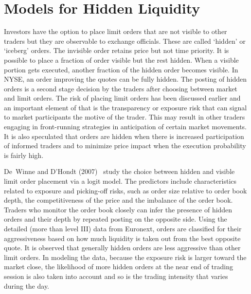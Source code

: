 \section{Models for Hidden Liquidity}

Investors have the option to place limit orders that are not visible to other traders but they are observable to exchange officials. These are called `hidden' or `iceberg' orders. The invisible order retains price but not time priority. It is possible to place a fraction of order visible but the rest hidden. When a visible portion gets executed, another fraction of the hidden order becomes visible. In NYSE, an order improving the quotes can be fully hidden. The posting of hidden orders is a second stage decision by the traders after choosing between market and limit orders. The risk of placing limit orders has been discussed earlier and an important element of that is the transparency or exposure risk that can signal to market participants the motive of the trader. This may result in other traders engaging in front-running strategies in anticipation of certain market movements. It is also speculated that orders are hidden when there is increased participation of informed traders and to minimize price impact when the execution probability is fairly high. 


De~Winne and D'Hondt (2007)~\cite{winne} study the choice between hidden and visible limit order placement via a logit model. The predictors include characteristics related to exposure and picking-off risks, such as order size relative to order book depth, the competitiveness of the price and the imbalance of the order book. Traders who monitor the order book closely can infer the presence of hidden orders and their depth by repeated posting on the opposite side. Using the detailed (more than level III) data from Euronext, orders are classified for their aggressiveness based on how much liquidity is taken out from the best opposite quote. It is observed that generally hidden orders are less aggressive than other limit orders. In modeling the data, because the exposure risk is larger toward the market close, the likelihood of more hidden orders at the near end of trading session is also taken into account and so is the trading intensity that varies during the day. 


